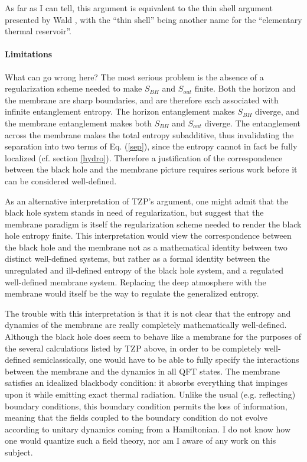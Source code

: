 \documentclass[12pt]{article}
\begin{document}
As far as I can tell, this argument is equivalent to the thin shell argument presented by Wald \cite{GW01}\cite{wald01}, with the ``thin shell'' being another name for the ``elementary thermal reservoir''.

\paragraph{Limitations}

What can go wrong here?  The most serious problem is the absence of a regularization scheme needed to make $S_{BH}$ and $S_{out}$ finite.  Both the horizon and the membrane are sharp boundaries, and are therefore each associated with infinite entanglement entropy.  The horizon entanglement makes $S_{BH}$ diverge, and the membrane entanglement makes both $S_{BH}$ and $S_{out}$ diverge.  The entanglement across the membrane makes the total entropy subadditive, thus invalidating the separation into two terms of Eq. (\ref{sep}), since the entropy cannot in fact be fully localized (cf. section \ref{hydro}).  Therefore a justification of the correspondence between the black hole and the membrane picture requires serious work before it can be considered well-defined.

As an alternative interpretation of TZP's argument, one might admit that the black hole system stands in need of regularization, but suggest that the membrane paradigm is itself the regularization scheme needed to render the black hole entropy finite.  This interpretation would view the correspondence between the black hole and the membrane not as a mathematical identity between two distinct well-defined systems, but rather as a formal identity between the unregulated and ill-defined entropy of the black hole system, and a regulated well-defined membrane system.  Replacing the deep atmosphere with the membrane would itself be the way to regulate the generalized entropy.

The trouble with this interpretation is that it is not clear that the entropy and dynamics of the membrane are really completely mathematically well-defined.  Although the black hole does seem to behave like a membrane for the purposes of the several calculations listed by TZP above, in order to be completely well-defined semiclassically, one would have to be able to fully specify the interactions between the membrane and the dynamics in all QFT states.  The membrane satisfies an idealized blackbody condition: it absorbs everything that impinges upon it while emitting exact thermal radiation.  Unlike the usual (e.g. reflecting) boundary conditions, this boundary condition permits the loss of information, meaning that the fields coupled to the boundary condition do not evolve according to unitary dynamics coming from a Hamiltonian.  I do not know how one would quantize such a field theory, nor am I aware of any work on this subject.
\end{document}
